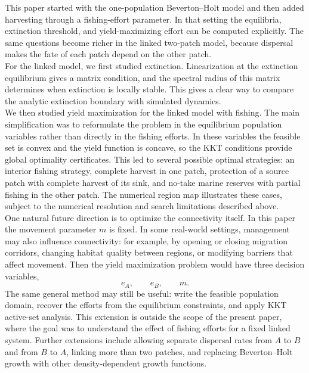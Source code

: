 \documentclass{article}
\numberwithin{equation}{section}
\begin{document}
This paper started with the one-population Beverton--Holt model and then
added harvesting through a fishing-effort parameter. In that setting the
equilibria, extinction threshold, and yield-maximizing effort can be
computed explicitly. The same questions become richer in the linked
two-patch model, because dispersal makes the fate of each patch depend on
the other patch.
\\
For the linked model, we first studied extinction. Linearization at the
extinction equilibrium gives a matrix condition, and the spectral radius
of this matrix determines when extinction is locally stable. This gives a
clear way to compare the analytic extinction boundary with simulated
dynamics.
\\
We then studied yield maximization for the linked model with fishing.
The main simplification was to reformulate the problem in the equilibrium
population variables rather than directly in the fishing efforts. In
these variables the feasible set is convex and the yield function is
concave, so the KKT conditions provide global optimality certificates.
This led to several possible optimal strategies: an interior fishing
strategy, complete harvest in one patch, protection of a source patch
with complete harvest of its sink, and no-take marine reserves with
partial fishing in the other patch.
The numerical region map illustrates these cases, subject to the
numerical resolution and search limitations described above.
\\
One natural future direction is to optimize the connectivity itself. In
this paper the movement parameter $m$ is fixed. In some real-world
settings, management may also influence connectivity: for example, by
opening or closing migration corridors, changing habitat quality between
regions, or modifying barriers that affect movement. Then the yield
maximization problem would have three decision variables,
\begin{equation*}
    e_A,\qquad e_B,\qquad m.
\end{equation*}
The same general method may still be useful: write the feasible
population domain, recover the efforts from the equilibrium constraints,
and apply KKT active-set analysis. This extension is outside the scope of
the present paper, where the goal was to understand the effect of fishing
efforts for a fixed linked system. Further extensions include allowing
separate dispersal rates from $A$ to $B$ and from $B$ to $A$, linking
more than two patches, and replacing Beverton--Holt growth with other
density-dependent growth functions.
\end{document}
